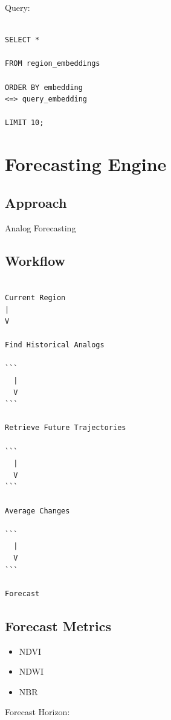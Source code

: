\documentclass[11pt,a4paper]{article}
\begin{document}
Query:

\begin{verbatim}

SELECT *

FROM region_embeddings

ORDER BY embedding
<=> query_embedding

LIMIT 10;

\end{verbatim}

\section{Forecasting Engine}

\subsection{Approach}

Analog Forecasting

\subsection{Workflow}

\begin{verbatim}

Current Region
|
V

Find Historical Analogs

```
  |
  V
```

Retrieve Future Trajectories

```
  |
  V
```

Average Changes

```
  |
  V
```

Forecast

\end{verbatim}


\subsection{Forecast Metrics}

\begin{itemize}
\item NDVI
\item NDWI
\item NBR
\end{itemize}

Forecast Horizon:
\end{document}
